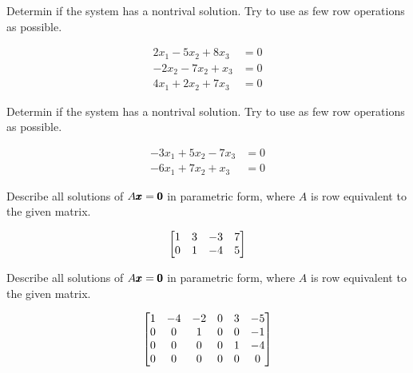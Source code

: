 \documentclass{../mathhomework}
\newenvironment{Mat}{\begin{bmatrix}}{\end{bmatrix}}
\begin{document}
\begin{problem}[1.5\#1]
    Determin if the system  has a nontrival solution. Try to use as few row operations as possible.

    \begin{align*}
        2x_1 - 5x_2 + 8x_3 &= 0 \\
        -2x_2 - 7x_2 + x_3 &= 0 \\
        4x_1 + 2x_2 + 7x_3 &= 0
    \end{align*}
\end{problem}

\begin{problem}[1.5\#3]
    Determin if the system  has a nontrival solution. Try to use as few row operations as possible.

    \begin{align*}
        -3x_1 + 5x_2 - 7x_3 &= 0 \\
        -6x_1 + 7x_2 + x_3 &= 0
    \end{align*}
\end{problem}

\begin{problem}[1.5\#7]
    Describe all solutions of $A\pmb{x} = \pmb{0}$ in parametric form, where $A$ is row equivalent to the given matrix.

    \begin{equation*}
        \begin{Mat}
            1 & 3 & -3 & 7 \\
            0 & 1 & -4 & 5
        \end{Mat}
    \end{equation*}
\end{problem}

\begin{problem}[1.5\#11]
    Describe all solutions of $A\pmb{x} = \pmb{0}$ in parametric form, where $A$ is row equivalent to the given matrix.

    \begin{equation*}
        \begin{Mat}
            1 & -4 & -2 & 0 & 3 & -5 \\
            0 & 0 & 1 & 0 & 0 & -1 \\
            0 & 0 & 0 & 0 & 1 & -4 \\
            0 & 0 & 0 & 0 & 0 & 0
        \end{Mat}
    \end{equation*}
\end{problem}
\end{document}
